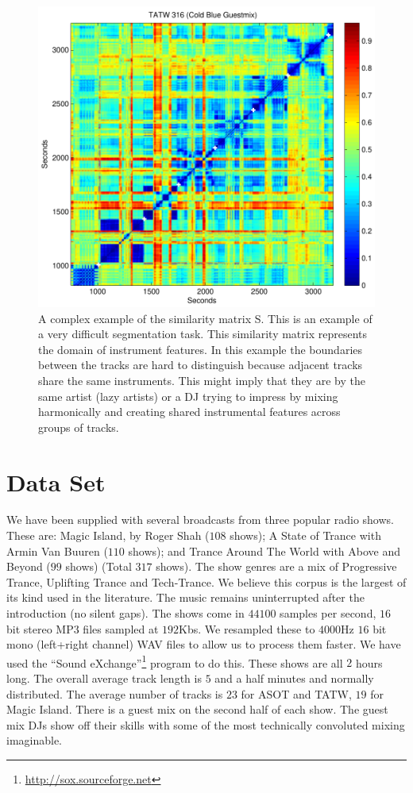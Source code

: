 \documentclass[twocolumn]{article}
\begin{document}
    \begin{figure}[htb]
    \centering
         \includegraphics[width= \linewidth]{images/simmat_hardexample.pdf}
       \caption{A complex example of the similarity matrix S. This is an example of a very difficult segmentation task. This similarity matrix represents the domain of instrument features. In this example the boundaries between the tracks are hard to distinguish because adjacent tracks share the same instruments. This might imply that they are by the same artist (lazy artists) or a DJ trying to impress by mixing harmonically and creating shared instrumental features across groups of tracks.}
        \end{figure}
    



\section{Data Set}\label{dataset}

We have been supplied with several broadcasts from three popular radio shows. These are: Magic Island, by Roger Shah ($108$ shows); A State of Trance with Armin Van Buuren ($110$ shows); and Trance Around The World with Above and Beyond ($99$ shows) (Total $317$ shows). The show genres are a mix of Progressive Trance, Uplifting Trance and Tech-Trance. We believe this corpus is the largest of its kind used \cite{peiszer2008automatic} in the literature.  
The music remains uninterrupted after the introduction (no silent gaps). 
The shows come in $44100$ samples per second, $16$ bit stereo MP3 files sampled at $192$Kbs. We resampled these to $4000$Hz $16$ bit mono (left+right channel) WAV files to allow us to process them faster. We have used the ``Sound eXchange''\footnote{\url{http://sox.sourceforge.net}}  program to do this. These shows are all $2$ hours long. The overall average track length is $5$ and a half minutes and normally distributed. The average number of tracks is $23$ for ASOT and TATW, $19$ for Magic Island. There is a guest mix on the second half of each show. The guest mix DJs show off their skills with some of the most technically convoluted mixing imaginable.
\end{document}
